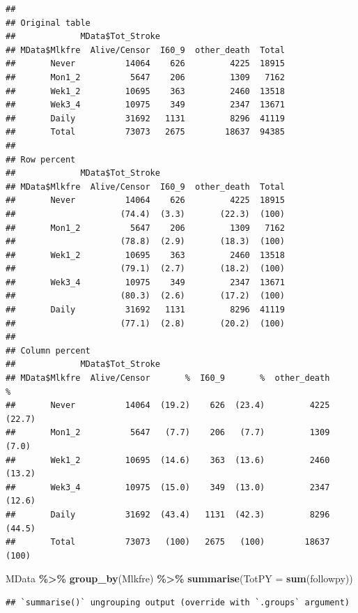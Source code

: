 \documentclass[
]{article}
\newenvironment{Shaded}{\begin{snugshade}}{\end{snugshade}}
\newcommand{\DataTypeTok}[1]{\textcolor[rgb]{0.13,0.29,0.53}{#1}}
\newcommand{\KeywordTok}[1]{\textcolor[rgb]{0.13,0.29,0.53}{\textbf{#1}}}
\newcommand{\NormalTok}[1]{#1}
\newcommand{\OperatorTok}[1]{\textcolor[rgb]{0.81,0.36,0.00}{\textbf{#1}}}
\newcommand{\StringTok}[1]{\textcolor[rgb]{0.31,0.60,0.02}{#1}}
\begin{document}
\begin{verbatim}
## 
## Original table 
##             MData$Tot_Stroke
## MData$Mlkfre  Alive/Censor  I60_9  other_death  Total
##       Never          14064    626         4225  18915
##       Mon1_2          5647    206         1309   7162
##       Wek1_2         10695    363         2460  13518
##       Wek3_4         10975    349         2347  13671
##       Daily          31692   1131         8296  41119
##       Total          73073   2675        18637  94385
## 
## Row percent 
##             MData$Tot_Stroke
## MData$Mlkfre  Alive/Censor  I60_9  other_death  Total
##       Never          14064    626         4225  18915
##                     (74.4)  (3.3)       (22.3)  (100)
##       Mon1_2          5647    206         1309   7162
##                     (78.8)  (2.9)       (18.3)  (100)
##       Wek1_2         10695    363         2460  13518
##                     (79.1)  (2.7)       (18.2)  (100)
##       Wek3_4         10975    349         2347  13671
##                     (80.3)  (2.6)       (17.2)  (100)
##       Daily          31692   1131         8296  41119
##                     (77.1)  (2.8)       (20.2)  (100)
## 
## Column percent 
##             MData$Tot_Stroke
## MData$Mlkfre  Alive/Censor       %  I60_9       %  other_death       %
##       Never          14064  (19.2)    626  (23.4)         4225  (22.7)
##       Mon1_2          5647   (7.7)    206   (7.7)         1309   (7.0)
##       Wek1_2         10695  (14.6)    363  (13.6)         2460  (13.2)
##       Wek3_4         10975  (15.0)    349  (13.0)         2347  (12.6)
##       Daily          31692  (43.4)   1131  (42.3)         8296  (44.5)
##       Total          73073   (100)   2675   (100)        18637   (100)
\end{verbatim}

\begin{Shaded}
\begin{Highlighting}[]
\NormalTok{MData }\OperatorTok{\%\textgreater{}\%}\StringTok{ }
\StringTok{  }\KeywordTok{group\_by}\NormalTok{(Mlkfre) }\OperatorTok{\%\textgreater{}\%}\StringTok{ }
\StringTok{  }\KeywordTok{summarise}\NormalTok{(}\DataTypeTok{TotPY =} \KeywordTok{sum}\NormalTok{(followpy))}
\end{Highlighting}
\end{Shaded}

\begin{verbatim}
## `summarise()` ungrouping output (override with `.groups` argument)
\end{verbatim}
\end{document}

